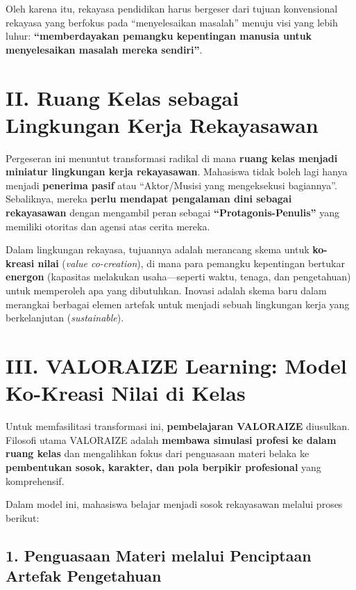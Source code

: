 \documentclass[
  letterpaper,
  DIV=11,
  numbers=noendperiod]{scrreprt}
\begin{document}
Oleh karena itu, rekayasa pendidikan harus bergeser dari tujuan
konvensional rekayasa yang berfokus pada ``menyelesaikan masalah''
menuju visi yang lebih luhur: \textbf{``memberdayakan pemangku
kepentingan manusia untuk menyelesaikan masalah mereka sendiri''}.

\section{II. Ruang Kelas sebagai Lingkungan Kerja
Rekayasawan}\label{ii.-ruang-kelas-sebagai-lingkungan-kerja-rekayasawan}

Pergeseran ini menuntut transformasi radikal di mana \textbf{ruang kelas
menjadi miniatur lingkungan kerja rekayasawan}. Mahasiswa tidak boleh
lagi hanya menjadi \textbf{penerima pasif} atau ``Aktor/Musisi yang
mengeksekusi bagiannya''. Sebaliknya, mereka \textbf{perlu mendapat
pengalaman dini sebagai rekayasawan} dengan mengambil peran sebagai
\textbf{``Protagonis-Penulis''} yang memiliki otoritas dan agensi atas
cerita mereka.

Dalam lingkungan rekayasa, tujuannya adalah merancang skema untuk
\textbf{ko-kreasi nilai} (\emph{value co-creation}), di mana para
pemangku kepentingan bertukar \textbf{energon} (kapasitas melakukan
usaha---seperti waktu, tenaga, dan pengetahuan) untuk memperoleh apa
yang dibutuhkan. Inovasi adalah skema baru dalam merangkai berbagai
elemen artefak untuk menjadi sebuah lingkungan kerja yang berkelanjutan
(\emph{sustainable}).

\section{III. VALORAIZE Learning: Model Ko-Kreasi Nilai di
Kelas}\label{iii.-valoraize-learning-model-ko-kreasi-nilai-di-kelas}

Untuk memfasilitasi transformasi ini, \textbf{pembelajaran VALORAIZE}
diusulkan. Filosofi utama VALORAIZE adalah \textbf{membawa simulasi
profesi ke dalam ruang kelas} dan mengalihkan fokus dari penguasaan
materi belaka ke \textbf{pembentukan sosok, karakter, dan pola berpikir
profesional} yang komprehensif.

Dalam model ini, mahasiswa belajar menjadi sosok rekayasawan melalui
proses berikut:

\subsection{1. Penguasaan Materi melalui Penciptaan Artefak
Pengetahuan}\label{penguasaan-materi-melalui-penciptaan-artefak-pengetahuan}
\end{document}
